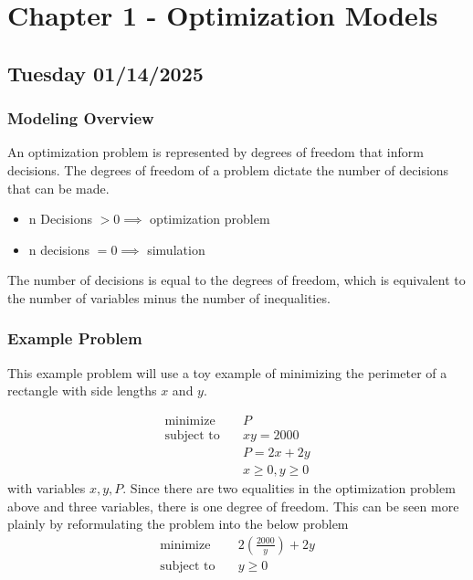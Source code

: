 \section{Chapter 1 - Optimization Models}

\subsection{Tuesday 01/14/2025}
\subsubsection{Modeling Overview}
An optimization problem is represented by degrees of freedom that inform decisions. The degrees of freedom of a problem dictate the number of decisions that can be made.
\begin{itemize}
    \item n Decisions $> 0 \implies$ optimization problem
    \item n decisions $= 0 \implies$ simulation
\end{itemize}
The number of decisions is equal to the degrees of freedom, which is equivalent to the number of variables minus the number of inequalities.
\subsubsection{Example Problem}
This example problem will use a toy example of minimizing the perimeter of a rectangle with side lengths $x$ and $y$.

\begin{align}
  \text{minimize} & \quad P \\
  \text{subject to} & \quad xy = 2000 \\
  & \quad P = 2x + 2y \\
  & \quad x \geq 0, y \geq 0
\end{align}
with variables $x, y, P$. Since there are two equalities in the optimization problem above and three variables, there is one degree of freedom. This can be seen more plainly by reformulating the problem into the below problem
\begin{align}
    \text{minimize} & \quad 2 (\frac{2000}{y})+2y \\
    \text{subject to} & \quad y \geq 0
\end{align}
